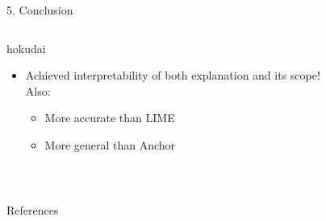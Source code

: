 \documentclass[unicode]{beamer}
\begin{document}
\begin{frame}
\begin{columns}[t]
\begin{column}{\rcol\textwidth}
\begin{block}{5. Conclusion}
        \vspace{0.5em}
        \begin{columns}
          \begin{column}{0.8\textwidth}
            \begin{beamercolorbox}[wd=\textwidth,colsep=0.3cm,rounded=true,shadow=true]{hokudai}
              \vspace{-0.3em}
              \begin{itemize}
                \item Achieved interpretability of both explanation and its scope! \\ [0.8em]
                      Also:
                      \begin{itemize}
                        \item More accurate than LIME
                        \item More general than Anchor
                      \end{itemize}
              \end{itemize}
            \end{beamercolorbox}~%
          \end{column}
        \end{columns}
      \end{block}
      \vspace{-0.6em}
      \begin{block}{References}
        \vspace{-0.6em}
        \begin{columns}[t]
          \begin{column}{0.99\textwidth}
            \printbibliography{}
          \end{column}
          \begin{column}{0.01\textwidth}
          \end{column}
        \end{columns}
        \vspace{-0.4em}
      \end{block}
    \end{column}
  \end{columns}
\end{frame}
\end{document}
